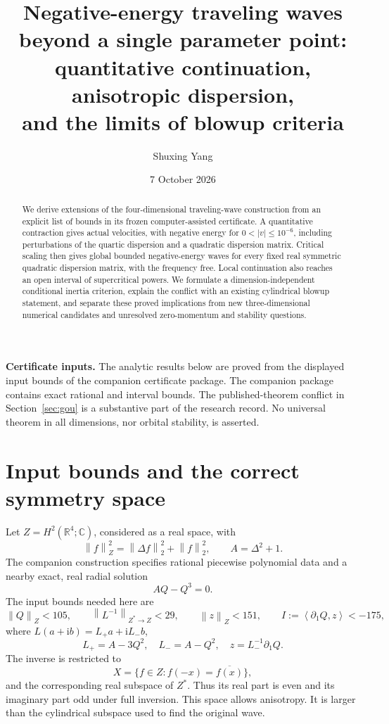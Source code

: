 \documentclass[11pt,a4paper]{article}
\title{Negative-energy traveling waves beyond a single parameter point:\\quantitative continuation, anisotropic dispersion,\\and the limits of blowup criteria}
\author{Shuxing Yang}
\date{7 October 2026}
\theoremstyle{remark}\newtheorem{remark}[theorem]{Remark}
\newcommand{\R}{\mathbb R}\newcommand{\C}{\mathbb C}
\newcommand{\ii}{\mathrm i}\newcommand{\dd}{\,\mathrm d}
\newcommand{\norm}[1]{\left\|#1\right\|}
\newcommand{\ip}[2]{\left\langle #1,#2\right\rangle}
\begin{document}
\maketitle
\begin{abstract}
We derive extensions of the four-dimensional traveling-wave construction from an explicit list of bounds in its frozen computer-assisted certificate. A quantitative contraction gives actual velocities, with negative energy for $0<|v|\le10^{-6}$, including perturbations of the quartic dispersion and a quadratic dispersion matrix. Critical scaling then gives global bounded negative-energy waves for every fixed real symmetric quadratic dispersion matrix, with the frequency free. Local continuation also reaches an open interval of supercritical powers. We formulate a dimension-independent conditional inertia criterion, explain the conflict with an existing cylindrical blowup statement, and separate these proved implications from new three-dimensional numerical candidates and unresolved zero-momentum and stability questions.
\end{abstract}

\noindent\textbf{Certificate inputs.} The analytic results below are proved from the displayed input bounds of the companion certificate package. The companion package contains exact rational and interval bounds. The published-theorem conflict in Section~\ref{sec:gou} is a substantive part of the research record. No universal theorem in all dimensions, nor orbital stability, is asserted.

\section{Input bounds and the correct symmetry space}
Let $Z=H^2(\R^4;\C)$, considered as a real space, with
\[
 \norm f_Z^2=\norm{\Delta f}_2^2+\norm f_2^2,
 \qquad A=\Delta^2+1.
\]
The companion construction specifies rational piecewise polynomial data and a nearby exact, real radial solution
\[
 AQ-Q^3=0.
\]
The input bounds needed here are
\begin{equation}\label{eq:inputs}
 \norm Q_Z<105,\qquad
 \norm{L^{-1}}_{Z^*\to Z}<29,\qquad
 \norm z_Z<151,\qquad I:=\ip{\partial_1Q}{z}<-175,
\end{equation}
where $L(a+\ii b)=L_+a+\ii L_-b$,
\[
 L_+=A-3Q^2,\quad L_-=A-Q^2,\quad z=L_-^{-1}\partial_1Q.
\]
The inverse is restricted to
\begin{equation}\label{eq:PT}
 X=\{f\in Z:f(-x)=\overline{f(x)}\},
\end{equation}
and the corresponding real subspace of $Z^*$. Thus its real part is even and its imaginary part odd under full inversion. This space allows anisotropy. It is larger than the cylindrical subspace used to find the original wave.
\end{document}
